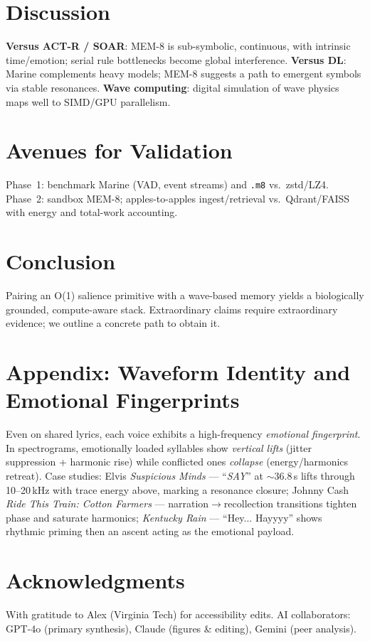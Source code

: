 \documentclass[conference]{IEEEtran}
\begin{document}
\section{Discussion}
\textbf{Versus ACT-R / SOAR}: MEM-8 is sub-symbolic, continuous, with intrinsic time/emotion; serial rule bottlenecks become global interference. \textbf{Versus DL}: Marine complements heavy models; MEM-8 suggests a path to emergent symbols via stable resonances. \textbf{Wave computing}: digital simulation of wave physics maps well to SIMD/GPU parallelism.

\section{Avenues for Validation}
Phase~1: benchmark Marine (VAD, event streams) and \texttt{.m8} vs.\ zstd/LZ4. Phase~2: sandbox MEM-8; apples-to-apples ingest/retrieval vs.\ Qdrant/FAISS with energy and total-work accounting.

\section{Conclusion}
Pairing an O(1) salience primitive with a wave-based memory yields a biologically grounded, compute-aware stack. Extraordinary claims require extraordinary evidence; we outline a concrete path to obtain it.

\appendices
\section{Appendix: Waveform Identity and Emotional Fingerprints}
Even on shared lyrics, each voice exhibits a high-frequency \emph{emotional fingerprint}. In spectrograms, emotionally loaded syllables show \emph{vertical lifts} (jitter suppression + harmonic rise) while conflicted ones \emph{collapse} (energy/harmonics retreat). Case studies: Elvis \emph{Suspicious Minds} --- ``\emph{SAY}'' at $\sim$36.8\,s lifts through 10–20\,kHz with trace energy above, marking a resonance closure; Johnny Cash \emph{Ride This Train: Cotton Farmers} --- narration$\rightarrow$recollection transitions tighten phase and saturate harmonics; \emph{Kentucky Rain} --- ``Hey... Hayyyy'' shows rhythmic priming then an ascent acting as the emotional payload.

\section*{Acknowledgments}
With gratitude to Alex (Virginia Tech) for accessibility edits. AI collaborators: GPT\!-4o (primary synthesis), Claude (figures \& editing), Gemini (peer analysis).


% 
\end{document}
